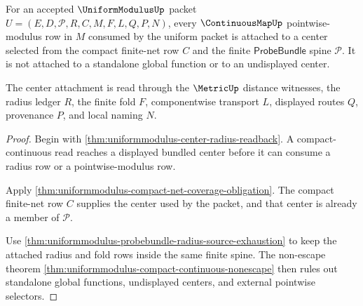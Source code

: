 \begin{theorem}
\label{thm:uniformmodulus-pointwise-modulus-center-exactness}
For an accepted $\UniformModulusUp$ packet $U=(E,D,\mathcal{P},R,C,M,F,L,Q,P,N)$, every $\ContinuousMapUp$ pointwise-modulus row in $M$ consumed by the uniform packet is attached to a center selected from the compact finite-net row $C$ and the finite $\mathsf{ProbeBundle}$ spine $\mathcal{P}$. It is not attached to a standalone global function or to an undisplayed center.

The center attachment is read through the $\MetricUp$ distance witnesses, the radius ledger $R$, the finite fold $F$, componentwise transport $L$, displayed routes $Q$, provenance $P$, and local naming $N$.
\end{theorem}
\begin{proof}
Begin with \autoref{thm:uniformmodulus-center-radius-readback}. A compact-continuous read reaches a displayed bundled center before it can consume a radius row or a pointwise-modulus row.

Apply \autoref{thm:uniformmodulus-compact-net-coverage-obligation}. The compact finite-net row $C$ supplies the center used by the packet, and that center is already a member of $\mathcal{P}$.

Use \autoref{thm:uniformmodulus-probebundle-radius-source-exhaustion} to keep the attached radius and fold rows inside the same finite spine. The non-escape theorem \autoref{thm:uniformmodulus-compact-continuous-nonescape} then rules out standalone global functions, undisplayed centers, and external pointwise selectors.
\end{proof}

